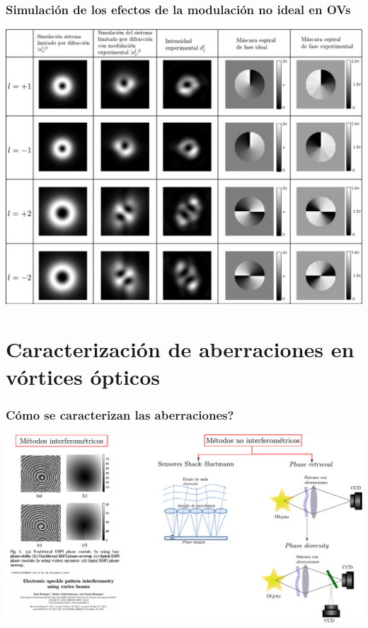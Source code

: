 \documentclass[serif,8pt]{beamer}
\begin{document}
		\begin{frame}
		\frametitle{Simulación de los efectos de la modulación no ideal en OVs}
		\begin{center}
		 \includegraphics[scale=0.4]{img/SimOVExp.pdf}
		 \end{center}
		\end{frame}
				
				
				

\section{Caracterización de aberraciones en vórtices ópticos}
	\setcounter{subsection}{1}
	
		\begin{frame}
		\frametitle{Cómo se caracterizan las aberraciones?}
			\includegraphics[scale=0.5]{img/WFS.pdf}
		\end{frame}
		
\end{document}

